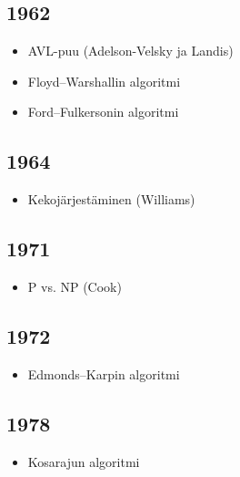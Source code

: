 \subsection*{1962}

\begin{itemize}
\item
AVL-puu (Adelson-Velsky ja Landis)
\item
Floyd–Warshallin algoritmi
\item
Ford–Fulkersonin algoritmi
\end{itemize}

\subsection*{1964}

\begin{itemize}
\item
Kekojärjestäminen (Williams)
\end{itemize}

\subsection*{1971}

\begin{itemize}
\item
P vs. NP (Cook)
\end{itemize}

\subsection*{1972}

\begin{itemize}
\item
Edmonds–Karpin algoritmi
\end{itemize}

\subsection*{1978}

\begin{itemize}
\item
Kosarajun algoritmi
\end{itemize}
